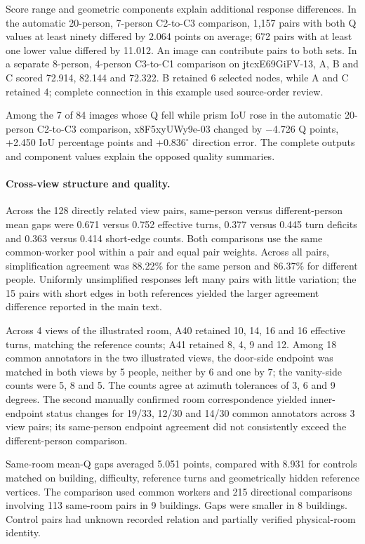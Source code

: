 Score range and geometric components explain additional response differences. In the automatic 20-person, 7-person C2-to-C3 comparison, 1,157 pairs with both Q values at least ninety differed by 2.064 points on average; 672 pairs with at least one lower value differed by 11.012. An image can contribute pairs to both sets. In a separate 8-person, 4-person C3-to-C1 comparison on jtcxE69GiFV-13, A, B and C scored 72.914, 82.144 and 72.322. B retained 6 selected nodes, while A and C retained 4; complete connection in this example used source-order review.

Among the 7 of 84 images whose Q fell while prism IoU rose in the automatic 20-person C2-to-C3 comparison, x8F5xyUWy9e-03 changed by $-$4.726 Q points, +2.450 IoU percentage points and +$0.836^\circ$ direction error. The complete outputs and component values explain the opposed quality summaries.

\paragraph{Cross-view structure and quality.}
Across the 128 directly related view pairs, same-person versus different-person mean gaps were 0.671 versus 0.752 effective turns, 0.377 versus 0.445 turn deficits and 0.363 versus 0.414 short-edge counts. Both comparisons use the same common-worker pool within a pair and equal pair weights. Across all pairs, simplification agreement was 88.22\% for the same person and 86.37\% for different people. Uniformly unsimplified responses left many pairs with little variation; the 15 pairs with short edges in both references yielded the larger agreement difference reported in the main text.

Across 4 views of the illustrated room, A40 retained 10, 14, 16 and 16 effective turns, matching the reference counts; A41 retained 8, 4, 9 and 12. Among 18 common annotators in the two illustrated views, the door-side endpoint was matched in both views by 5 people, neither by 6 and one by 7; the vanity-side counts were 5, 8 and 5. The counts agree at azimuth tolerances of 3, 6 and 9 degrees. The second manually confirmed room correspondence yielded inner-endpoint status changes for 19/33, 12/30 and 14/30 common annotators across 3 view pairs; its same-person endpoint agreement did not consistently exceed the different-person comparison.

Same-room mean-Q gaps averaged 5.051 points, compared with 8.931 for controls matched on building, difficulty, reference turns and geometrically hidden reference vertices. The comparison used common workers and 215 directional comparisons involving 113 same-room pairs in 9 buildings. Gaps were smaller in 8 buildings. Control pairs had unknown recorded relation and partially verified physical-room identity.

